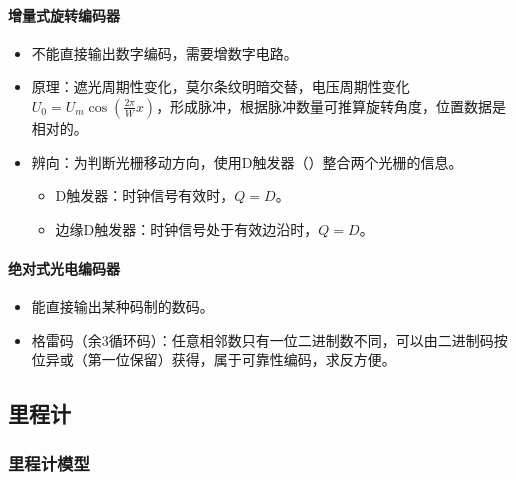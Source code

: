 \documentclass[
12pt, %
a4paper, 
oneside, %
headinclude,footinclude, %
]{scrartcl}
\begin{document}
\paragraph{增量式旋转编码器}
\begin{itemize}
\item 不能直接输出数字编码，需要增数字电路。
\item 原理：遮光周期性变化，莫尔条纹明暗交替，电压周期性变化$ U_0 = U_m \cos(\frac{2\pi}{W}x) $，形成脉冲，根据脉冲数量可推算旋转角度，位置数据是相对的。
\item 辨向：为判断光栅移动方向，使用D触发器（）整合两个光栅的信息。
\begin{itemize}
\item D触发器：时钟信号有效时，$ Q = D $。
\item 边缘D触发器：时钟信号处于有效边沿时，$ Q = D $。
\end{itemize}
\end{itemize}
\paragraph{绝对式光电编码器}
\begin{itemize}
\item 能直接输出某种码制的数码。
\item 格雷码（余$ 3 $循环码）：任意相邻数只有一位二进制数不同，可以由二进制码按位异或（第一位保留）获得，属于可靠性编码，求反方便。
\end{itemize}
\subsection[里程计]{里程计}
\subsubsection[里程计模型]{里程计模型}\label{sec:odometer}
\end{document}
